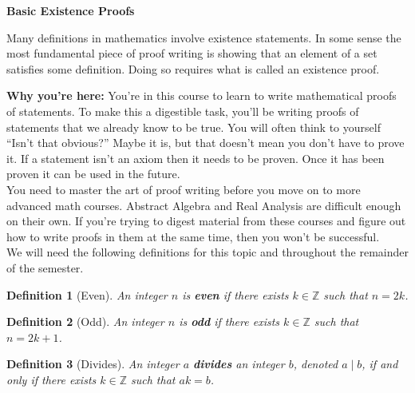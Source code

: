 \documentclass[12 pt]{article}
\newcommand{\Z}{\mathbb{Z}}
\newcommand{\divides}{\! \mid \!}
\theoremstyle{definition}
\theoremstyle{plain}
\theoremstyle{mytheorem}
\theoremstyle{myexample}
\theoremstyle{mydefinition}
\newtheorem{definition}{Definition}
\begin{document}
\begin{center}
\textbf{Basic Existence Proofs}
\end{center}

Many definitions in mathematics involve existence statements.  In some sense the most fundamental piece of proof writing is showing that an element of a set satisfies some definition.  Doing so requires what is called an existence proof.

\begin{center}
\end{center}

\noindent \textbf{Why you're here:}  You're in this course to learn to write mathematical proofs of statements.  To make this a digestible task, you'll be writing proofs of statements that we already know to be true.  You will often think to yourself ``Isn't that obvious?''  Maybe it is, but that doesn't mean you don't have to prove it.  If a statement isn't an axiom then it needs to be proven.  Once it has been proven it can be used in the future.\\

You need to master the art of proof writing before you move on to more advanced math courses.  Abstract Algebra and Real Analysis are difficult enough on their own.  If you're trying to digest material from these courses and figure out how to write proofs in them at the same time, then you won't be successful.  \\

We will need the following definitions for this topic and throughout the remainder of the semester.

\begin{definition}[Even] An integer $n$ is \textbf{even} if there exists $k \in \Z$ such that  $n= 2k$.
\end{definition}

\begin{definition}[Odd] An integer $n$ is \textbf{odd} if there exists $k \in \Z$ such that $n=2k+1$.
\end{definition}

\begin{definition}[Divides] An integer $a$ \textbf{divides} an integer $b$, denoted $a \divides b$, if and only if there exists $k \in \Z$ such that $ak=b$.
\end{definition}
\end{document}
